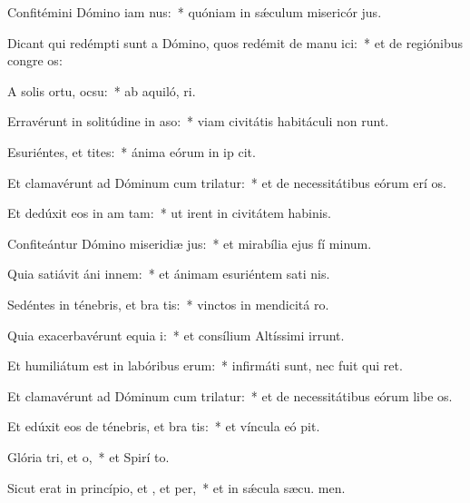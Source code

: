 \item Confitémini Dómino iam nus:~* quóniam in sǽculum misericór jus.
\item Dicant qui redémpti sunt a Dómino, quos redémit de manu ici:~* et de regiónibus congre os:
\item A solis ortu,  ocsu:~* ab aquiló,  ri.
\item Erravérunt in solitúdine in aso:~* viam civitátis habitáculi non runt.
\item Esuriéntes, et tites:~* ánima eórum in ip cit.
\item Et clamavérunt ad Dóminum cum trilatur:~* et de necessitátibus eórum erí os.
\item Et dedúxit eos in am tam:~* ut irent in civitátem habinis.
\item Confiteántur Dómino miseridiæ jus:~* et mirabília ejus fí minum.
\item Quia satiávit áni innem:~* et ánimam esuriéntem sati nis.
\item Sedéntes in ténebris, et bra tis:~* vinctos in mendicitá  ro.
\item Quia exacerbavérunt equia i:~* et consílium Altíssimi irrunt.
\item Et humiliátum est in labóribus  erum:~* infirmáti sunt, nec fuit qui ret.
\item Et clamavérunt ad Dóminum cum trilatur:~* et de necessitátibus eórum libe os.
\item Et edúxit eos de ténebris, et bra tis:~* et víncula eó pit.
\item Glória tri, et o,~* et Spirí to.
\item Sicut erat in princípio, et , et per,~* et in sǽcula sæcu. men.
